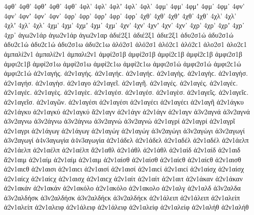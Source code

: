 {%
4φθ' 4φθ’ 4φθʼ 4φθ᾽ 4φθ᾿ 
4φλ' 4φλ’ 4φλʼ 4φλ᾽ 4φλ᾿ 
4φμ' 4φμ’ 4φμʼ 4φμ᾽ 4φμ᾿ 
4φν' 4φν’ 4φνʼ 4φν᾽ 4φν᾿ 
4φρ' 4φρ’ 4φρʼ 4φρ᾽ 4φρ᾿ 
%
4χθ' 4χθ’ 4χθʼ 4χθ᾽ 4χθ᾿ 
4χλ' 4χλ’ 4χλʼ 4χλ᾽ 4χλ᾿ 
4χμ' 4χμ’ 4χμʼ 4χμ᾽ 4χμ᾿ 
4χν' 4χν’ 4χνʼ 4χν᾽ 4χν᾿ 
4χρ' 4χρ’ 4χρʼ 4χρ᾽ 4χρ᾿ 
%
ἀγω2ν1άρ ἀγω2ν1άρ   %
ἀγω2ν1αρ 
ἀδιέ2ξ1 ἀδιέ2ξ1   %
ἀδιε2ξ1 
ἀδυ2σ1ώ ἀδυ2σ1ώ ἀδυ2ϲ1ώ ἀδυ2ϲ1ώ   %
ἀδυ2σ1ω ἀδυ2ϲ1ω 
ἁλό2σ1 ἁλό2σ1 ἁλό2ϲ1 ἁλό2ϲ1   %
ἁλο2σ1 ἁλο2ϲ1 
ἀμπαλί2ν1 ἀμπαλί2ν1   %
ἀμπαλι2ν1 
ἀμφί2σ1β ἀμφί2σ1β ἀμφί2ϲ1β ἀμφί2ϲ1β   %
ἀμφι2σ1β ἀμφι2ϲ1β 
ἀμφί2σ1ω ἀμφί2σ1ω ἀμφί2ϲ1ω ἀμφί2ϲ1ω   %
ἀμφι2σ1ώ ἀμφι2σ1ώ ἀμφι2ϲ1ώ ἀμφι2ϲ1ώ 
ἀ2ν1αγής. ἀ2ν1αγής. ἀ2ν1αγήϲ. ἀ2ν1αγήϲ.   %
ἀ2ν1αγὴς. ἀ2ν1αγὴϲ. 
ἀ2ν1αγήσ. ἀ2ν1αγήσ. 
ἀ2ν1αγὴσ. 
ἀ2ν1αγο 
ἀ2ν1αγεῖ. 
ἀ2ν1αγῆ. 
ἀ2ν1αγές. ἀ2ν1αγές. ἀ2ν1αγέϲ. ἀ2ν1αγέϲ. 
ἀ2ν1αγὲς. ἀ2ν1αγὲϲ. 
ἀ2ν1αγέσ. ἀ2ν1αγέσ. 
ἀ2ν1αγὲσ. 
ἀ2ν1αγεῖς. ἀ2ν1αγεῖϲ. 
ἀ2ν1αγεῖσ. 
ἀ2ν1αγῶν. 
ἀ2ν1αγέσι ἀ2ν1αγέσι ἀ2ν1αγέϲι ἀ2ν1αγέϲι 
ἀ2ν1αγῆ 
ἀ2ν1άγκυ ἀ2ν1άγκυ   %
ἀ2ν1αγκύ ἀ2ν1αγκύ 
ἄ2ν1αγν   %
ἀ2ν1άγν ἀ2ν1άγν 
ἀ2ν1αγν   %
ἀ3ν2αγνά ἀ3ν2αγνά   %
ἀ3ν2αγνω   %
ἀ3ν2άγνω ἀ3ν2άγνω   %
ἀ3ν2αγνώ ἀ3ν2αγνώ 
ἀ2ν1αγρί ἀ2ν1αγρί   %
ἀ2ν1αγρῖ   %
ἀ2ν1αγρι   %
ἀ2ν1άγωγ ἀ2ν1άγωγ   %
ἀ2ν1αγώγ ἀ2ν1αγώγ 
ἀ3ν2αγώγι ἀ3ν2αγώγι   %
ἀ3ν2αγωγί ἀ3ν2αγωγί 
ἀ4ν3αγωγία ἀ4ν3αγωγία   %
ἀ2ν1άδελ ἀ2ν1άδελ   %
ἀ2ν1αδέλ ἀ2ν1αδέλ 
ἀ2ν1άελπ ἀ2ν1άελπ   %
ἀ2ν1αέλπ ἀ2ν1αέλπ 
ἄ2ν1αθλ   %
ἀ2ν1άθλ ἀ2ν1άθλ 
ἀ2ν1αίδ ἀ2ν1αίδ   %
ἀ2ν1αιδ   %
ἄ2ν1αιμ   %
ἀ2ν1αίμ ἀ2ν1αίμ 
ἀ2ν1αιμ   %
ἀ2ν1αίσθ ἀ2ν1αίσθ ἀ2ν1αίϲθ ἀ2ν1αίϲθ   %
ἀ2ν1αισθ ἀ2ν1αιϲθ 
ἀ2ν1αισι ἀ2ν1αιϲι   %
ἀ2ν1αισί ἀ2ν1αισί ἀ2ν1αιϲί ἀ2ν1αιϲί 
ἀ2ν1αίσχ ἀ2ν1αίσχ ἀ2ν1αίϲχ ἀ2ν1αίϲχ   %
ἀ2ν1αισχ ἀ2ν1αιϲχ 
ἀ2ν1αίτ ἀ2ν1αίτ   %
ἀ2ν1αιτ 
ἀ2ν1άκαν ἀ2ν1άκαν   %
ἀ2ν1ακάν ἀ2ν1ακάν 
ἀ2ν1ακόλο ἀ2ν1ακόλο   %
ἀ2ν1ακολο 
ἀ2ν1αλγ   %
ἀ2ν1αλδ   %
ἀ3ν2αλδα   %
ἀ3ν2αλδήσκ ἀ3ν2αλδήσκ ἀ3ν2αλδήϲκ ἀ3ν2αλδήϲκ   %
ἀ2ν1άλειπ ἀ2ν1άλειπ   %
ἀ2ν1αλείπ ἀ2ν1αλείπ 
ἀ2ν1αλειφ   %
ἀ2ν1άλειφ ἀ2ν1άλειφ   %
ἀ2ν1αλείφ ἀ2ν1αλείφ 
ἀ2ν1αλήθ ἀ2ν1αλήθ   %
}
